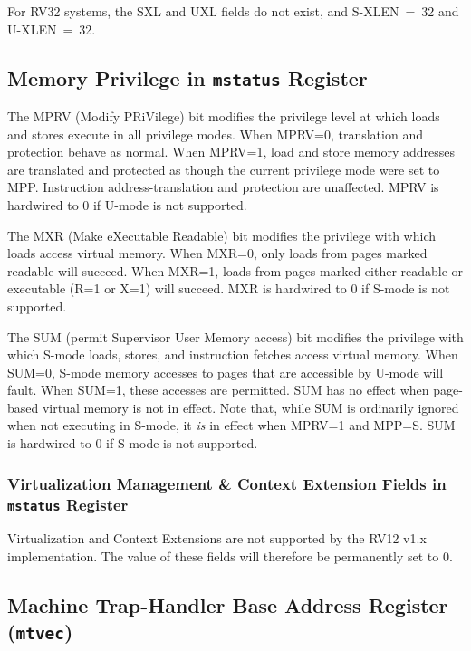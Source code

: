 For RV32 systems, the SXL and UXL fields do not exist, and
S-XLEN~=~32 and U-XLEN~=~32.

\subsection{Memory Privilege in {\tt mstatus} Register}

The MPRV (Modify PRiVilege) bit modifies the privilege level at which
loads and stores execute in all privilege modes.  When MPRV=0,
translation and protection behave as normal.  When MPRV=1, load and
store memory addresses are translated and protected as though the
current privilege mode were set to MPP.  Instruction
address-translation and protection are unaffected.  MPRV is hardwired
to 0 if U-mode is not supported.

The MXR (Make eXecutable Readable) bit modifies the privilege with which loads
access virtual memory.  When MXR=0, only loads from pages marked readable will
succeed.  When MXR=1, loads from pages marked
either readable or executable (R=1 or X=1) will succeed. MXR is hardwired to 0 if
S-mode is not supported.

The SUM (permit Supervisor User Memory access) bit modifies the privilege with
which S-mode loads, stores, and instruction fetches access virtual memory.
When SUM=0, S-mode memory accesses to pages that are accessible by U-mode will fault.  When SUM=1, these accesses are
permitted.  SUM has no effect when page-based virtual memory is not in effect.
Note that, while SUM is ordinarily ignored when not executing in S-mode, it
{\em is} in effect when MPRV=1 and MPP=S.  SUM is hardwired to 0 if S-mode is
not supported.

\subsubsection{Virtualization Management \& Context Extension Fields in
\texttt{mstatus} Register
}\label{virtualization-management-context-extension-fields-in-mstatus-register}

Virtualization and Context Extensions are not supported by the RV12 v1.x
implementation. The value of these fields will therefore be permanently
set to 0.

\subsection{Machine Trap-Handler Base Address Register
(\texttt{mtvec})}\label{machine-trap-handler-base-address-register-mtvec}

